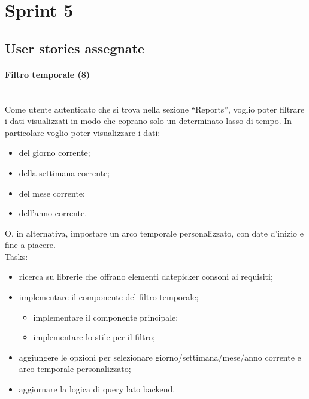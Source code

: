 
\section{Sprint 5}
\label{sec:sprint 5}

\subsection{User stories assegnate}
\paragraph{Filtro temporale (8)}\mbox{} \\[\baselineskip]
Come utente autenticato che si trova nella sezione “Reports”, voglio poter filtrare i dati visualizzati in modo che coprano solo un determinato lasso di tempo. In particolare voglio poter visualizzare i dati:
\begin{itemize}
  \item del giorno corrente;
  \item della settimana corrente;
  \item del mese corrente; 
  \item dell'anno corrente.
\end{itemize}
O, in alternativa, impostare un arco temporale personalizzato, con date d'inizio e fine a piacere.\\

\noindent Tasks:
\begin{itemize}
  \item ricerca su librerie che offrano elementi datepicker consoni ai requisiti;
  \item implementare il componente del filtro temporale;
  \begin{itemize}
    \item implementare il componente principale;
    \item implementare lo stile per il filtro;
  \end{itemize}
  \item aggiungere le opzioni per selezionare giorno/settimana/mese/anno corrente e arco temporale personalizzato;
  \item aggiornare la logica di query lato backend.
\end{itemize} 

